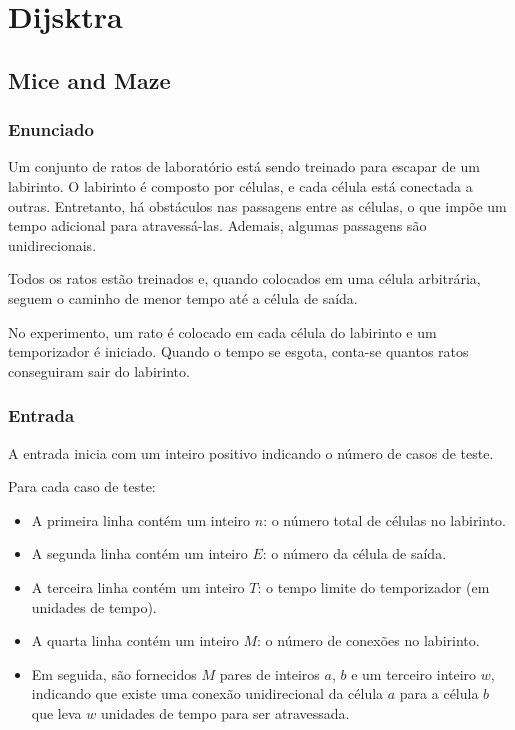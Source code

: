 \section{Dijsktra}
\subsection{Mice and Maze}

\subsubsection*{Enunciado}
Um conjunto de ratos de laboratório está sendo treinado para escapar de um labirinto. O labirinto é composto por células, e cada célula está conectada a outras. Entretanto, há obstáculos nas passagens entre as células, o que impõe um tempo adicional para atravessá-las. Ademais, algumas passagens são unidirecionais.

Todos os ratos estão treinados e, quando colocados em uma célula arbitrária, seguem o caminho de menor tempo até a célula de saída.

No experimento, um rato é colocado em cada célula do labirinto e um temporizador é iniciado. Quando o tempo se esgota, conta-se quantos ratos conseguiram sair do labirinto.

\subsubsection*{Entrada}
A entrada inicia com um inteiro positivo indicando o número de casos de teste.

Para cada caso de teste:
\begin{itemize}
    \item A primeira linha contém um inteiro \( n \): o número total de células no labirinto.
    \item A segunda linha contém um inteiro \( E \): o número da célula de saída.
    \item A terceira linha contém um inteiro \( T \): o tempo limite do temporizador (em unidades de tempo).
    \item A quarta linha contém um inteiro \( M \): o número de conexões no labirinto.
    \item Em seguida, são fornecidos \( M \) pares de inteiros \( a \), \( b \) e um terceiro inteiro \( w \), indicando que existe uma conexão unidirecional da célula \( a \) para a célula \( b \) que leva \( w \) unidades de tempo para ser atravessada.
\end{itemize}

